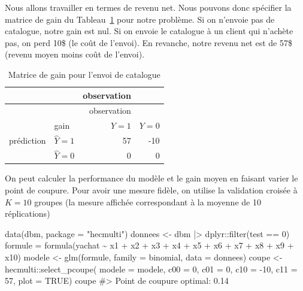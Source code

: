 \documentclass[
  11pt,
  letterpaper,
]{scrbook}
\newenvironment{Shaded}{\begin{snugshade}}{\end{snugshade}}
\newcommand{\AttributeTok}[1]{\textcolor[rgb]{0.40,0.45,0.13}{#1}}
\newcommand{\CommentTok}[1]{\textcolor[rgb]{0.37,0.37,0.37}{#1}}
\newcommand{\ConstantTok}[1]{\textcolor[rgb]{0.56,0.35,0.01}{#1}}
\newcommand{\DecValTok}[1]{\textcolor[rgb]{0.68,0.00,0.00}{#1}}
\newcommand{\FunctionTok}[1]{\textcolor[rgb]{0.28,0.35,0.67}{#1}}
\newcommand{\NormalTok}[1]{\textcolor[rgb]{0.00,0.23,0.31}{#1}}
\newcommand{\OtherTok}[1]{\textcolor[rgb]{0.00,0.23,0.31}{#1}}
\newcommand{\SpecialCharTok}[1]{\textcolor[rgb]{0.37,0.37,0.37}{#1}}
\newcommand{\StringTok}[1]{\textcolor[rgb]{0.13,0.47,0.30}{#1}}
\theoremstyle{definition}
\theoremstyle{remark}
\begin{document}
Nous allons travailler en termes de revenu net. Nous pouvons donc
spécifier la matrice de gain du Tableau~\ref{tbl-03-gain3} pour notre
problème. Si on n'envoie pas de catalogue, notre gain est nul. Si on
envoie le catalogue à un client qui n'achète pas, on perd 10\$ (le coût
de l'envoi). En revanche, notre revenu net est de 57\$ (revenu moyen
moins coût de l'envoi).

\hypertarget{tbl-03-gain3}{}
\begin{longtable}[]{@{}llrr@{}}
\caption{\label{tbl-03-gain3}Matrice de gain pour l'envoi de
catalogue}\tabularnewline
\toprule\noalign{}
& & observation & \\
\midrule\noalign{}
\endfirsthead
\toprule\noalign{}
& & observation & \\
\midrule\noalign{}
\endhead
\bottomrule\noalign{}
\endlastfoot
& gain & \(Y=1\) & \(Y=0\) \\
prédiction & \(\widehat{Y}=1\) & 57 & -10 \\
& \(\widehat{Y}=0\) & 0 & 0 \\
\end{longtable}

On peut calculer la performance du modèle et le gain moyen en faisant
varier le point de coupure. Pour avoir une mesure fidèle, on utilise la
validation croisée à \(K=10\) groupes (la mesure affichée correspondant
à la moyenne de 10 réplications)

\begin{Shaded}
\begin{Highlighting}[]
\FunctionTok{data}\NormalTok{(dbm, }\AttributeTok{package =} \StringTok{"hecmulti"}\NormalTok{)}
\NormalTok{donnees }\OtherTok{\textless{}{-}}\NormalTok{ dbm }\SpecialCharTok{|\textgreater{}} 
\NormalTok{  dplyr}\SpecialCharTok{::}\FunctionTok{filter}\NormalTok{(test }\SpecialCharTok{==} \DecValTok{0}\NormalTok{)}
\NormalTok{formule }\OtherTok{=} \FunctionTok{formula}\NormalTok{(yachat }\SpecialCharTok{\textasciitilde{}}\NormalTok{ x1 }\SpecialCharTok{+}\NormalTok{ x2 }\SpecialCharTok{+}\NormalTok{ x3 }\SpecialCharTok{+}
\NormalTok{                    x4 }\SpecialCharTok{+}\NormalTok{ x5 }\SpecialCharTok{+}\NormalTok{ x6 }\SpecialCharTok{+}\NormalTok{ x7 }\SpecialCharTok{+} 
\NormalTok{                    x8 }\SpecialCharTok{+}\NormalTok{ x9 }\SpecialCharTok{+}\NormalTok{ x10)}
\NormalTok{modele }\OtherTok{\textless{}{-}} \FunctionTok{glm}\NormalTok{(formule, }
              \AttributeTok{family =}\NormalTok{ binomial, }
              \AttributeTok{data =}\NormalTok{ donnees)}
\NormalTok{coupe }\OtherTok{\textless{}{-}}\NormalTok{ hecmulti}\SpecialCharTok{::}\FunctionTok{select\_pcoupe}\NormalTok{(}
  \AttributeTok{modele =}\NormalTok{ modele, }
  \AttributeTok{c00 =} \DecValTok{0}\NormalTok{, }
  \AttributeTok{c01 =} \DecValTok{0}\NormalTok{, }
  \AttributeTok{c10 =} \SpecialCharTok{{-}}\DecValTok{10}\NormalTok{, }
  \AttributeTok{c11 =} \DecValTok{57}\NormalTok{,}
  \AttributeTok{plot =} \ConstantTok{TRUE}\NormalTok{)}
\NormalTok{coupe}
\CommentTok{\#\textgreater{} Point de coupure optimal: 0.14}
\end{Highlighting}
\end{Shaded}
\end{document}
